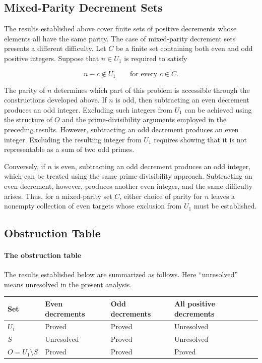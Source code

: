 \documentclass[11pt]{article}
\begin{document}
	
	\subsection{Mixed-Parity Decrement Sets}
	
	The results established above cover finite sets of positive decrements whose elements all have the same parity. The case of mixed-parity decrement sets presents a different difficulty. Let \(C\) be a finite set containing both even and odd positive integers. Suppose that \(n\in U_1\) is required to satisfy
	
	$$
	n-c\notin U_1
	\qquad\text{for every }c\in C.
	$$
	
	The parity of \(n\) determines which part of this problem is accessible through the constructions developed above. If \(n\) is odd, then subtracting an even decrement produces an odd integer. Excluding such integers from \(U_1\) can be achieved using the structure of \(O\) and the prime-divisibility arguments employed in the preceding results. However, subtracting an odd decrement produces an even integer. Excluding the resulting integer from \(U_1\) requires showing that it is not representable as a sum of two odd primes.
	
	Conversely, if \(n\) is even, subtracting an odd decrement produces an odd integer, which can be treated using the same prime-divisibility approach. Subtracting an even decrement, however, produces another even integer, and the same difficulty arises. Thus, for a mixed-parity set \(C\), either choice of parity for \(n\) leaves a nonempty collection of even targets whose exclusion from \(U_1\) must be established.
	
	
	\subsection{Obstruction Table}
	
	\paragraph{The obstruction table}
	
	The results established below are summarized as follows.
	Here ``unresolved'' means unresolved in the present analysis.
	
	\begin{center}
		\renewcommand{\arraystretch}{1.5}
		\begin{tabular}{>{\centering\arraybackslash}p{3cm}
				>{\centering\arraybackslash}p{3cm}
				>{\centering\arraybackslash}p{3cm}
				>{\centering\arraybackslash}p{3.5cm}}
			\toprule
			Set
			& Even decrements
			& Odd decrements
			& All positive decrements \\
			\midrule
			$U_1$
			& Proved
			& Proved
			& Unresolved \\
			
			$S$
			& Unresolved
			& Proved
			& Unresolved \\
			
			$O=U_1\setminus S$
			& Proved
			& Proved
			& Proved \\
			\bottomrule
		\end{tabular}
	\end{center}
	
\end{document}
